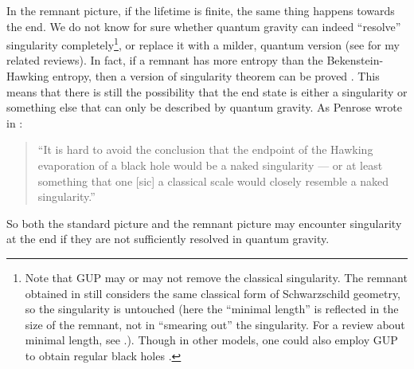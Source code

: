 \documentclass[12pt,preprintnumbers, floatfix, preprintnumbers, letterpaper, superscriptaddress,nofootinbib]{revtex4-2}
\begin{document}
In the remnant picture, if the lifetime is finite, the same thing happens towards the end. We do not know for sure whether quantum gravity can indeed ``resolve'' singularity completely\footnote{Note that GUP may or may not remove the classical singularity. The remnant obtained in \cite{0106080} still considers the same classical form of Schwarzschild geometry, so the singularity is untouched (here the ``minimal length'' is reflected in the size of the remnant, not in ``smearing out'' the singularity. For a review about minimal length, see \cite{1203.6191}.). Though in other models, one could also employ GUP to obtain regular black holes \cite{1305.3851,2109.05974}.}, or replace it with a milder, quantum version (see \cite{2005.07032,2210.16856} for my related reviews). In fact, if a remnant has more entropy than the Bekenstein-Hawking entropy, then a version of singularity theorem can be proved \cite{2201.11132}. 
This means that there is still the possibility that the end state is either a singularity or something else that can only be described by quantum gravity. As Penrose wrote in \cite{RP}: 
\begin{quote}``It
is hard to avoid the conclusion that the endpoint of the Hawking
evaporation of a black hole would be a naked singularity --- or at
least something that one [sic] a classical scale would closely resemble
a naked singularity.'' \end{quote}
So both the standard picture and the remnant picture may encounter singularity at the end if they are not sufficiently resolved in quantum gravity. 
\end{document}
